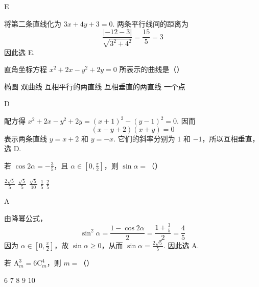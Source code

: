 \documentclass[UTF8,a4paper,oneside,11pt]{ctexbook}
\begin{document}
\begin{answer}
E
\end{answer}

\begin{solution}
将第二条直线化为 \(3x+4y+3=0\). 两条平行线间的距离为
\[
\frac{|-12-3|}{\sqrt{3^2+4^2}}=\frac{15}{5}=3
\]
因此选 E.
\end{solution}


\begin{problem}

直角坐标方程 \(x^{2} + 2x - y^{2} + 2y = 0\) 所表示的曲线是（\quad）

\choicesfive
    {椭圆}
    {双曲线}
    {互相平行的两直线}
    {互相垂直的两直线}
    {一个点}
\end{problem}

\begin{answer}
D
\end{answer}

\begin{solution}
配方得 \(x^2+2x-y^2+2y=(x+1)^2-(y-1)^2=0\). 因而
\[
(x-y+2)(x+y)=0
\]
表示两条直线 \(y=x+2\) 和 \(y=-x\). 它们的斜率分别为 \(1\) 和 \(-1\)，所以互相垂直，选 D.
\end{solution}


\begin{problem}

若 \(\cos 2\alpha = -\frac{3}{5}\)，且 \(\alpha \in \left[0, \frac{\pi}{2}\right]\)，则 \(\sin \alpha =\)（\quad）

\choicesfive
    {\(\frac{2\sqrt{5}}{5}\)}
    {\(\frac{\sqrt{5}}{5}\)}
    {\(\frac{\sqrt{5}}{10}\)}
    {\(\frac{1}{5}\)}
    {\(\frac{2}{5}\)}
\end{problem}

\begin{answer}
A
\end{answer}

\begin{solution}
由降幂公式，
\[
\sin^2\alpha=\frac{1-\cos2\alpha}{2}=\frac{1+\frac{3}{5}}{2}=\frac{4}{5}
\]
因为 \(\alpha\in[0,\frac{\pi}{2}]\)，故 \(\sin\alpha\geq0\)，从而 \(\sin\alpha=\frac{2\sqrt{5}}{5}\). 因此选 A.
\end{solution}


\begin{problem}

若 \(\mathrm A_m^3 = 6\mathrm C_m^4\)，则 \(m =\)（\quad）

\choicesfive
    {\(6\)}
    {\(7\)}
    {\(8\)}
    {\(9\)}
    {\(10\)}
\end{problem}
\end{document}
